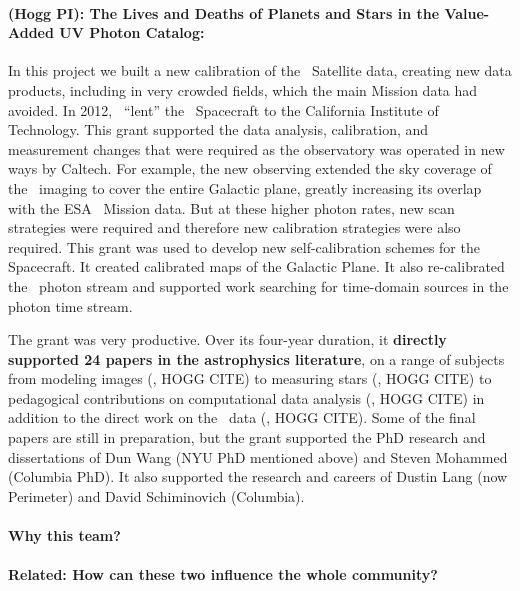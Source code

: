 \documentclass[12pt, letterpaper]{article}
\begin{document}
\paragraph{ (Hogg PI):
The Lives and Deaths of Planets and Stars in the Value-Added UV Photon Catalog:}
In this project we built a new calibration of the \GALEX\ Satellite
data, creating new data products, including in very crowded fields,
which the main Mission data had avoided.
In 2012, \NASA\ ``lent'' the \GALEX\ Spacecraft to the California Institute of Technology.
This grant supported the data analysis, calibration, and measurement
changes that were required as the observatory was operated in new
ways by Caltech.
For example, the new observing extended the sky coverage of the \GALEX\ imaging to
cover the entire Galactic plane, greatly increasing its overlap with
the ESA \Gaia\ Mission data.
But at these higher photon rates, new scan strategies were required and therefore
new calibration strategies were also required.
This grant was used to develop new self-calibration schemes for the Spacecraft.
It created calibrated maps of the Galactic Plane.
It also re-calibrated the \GALEX\ photon stream and supported work
searching for time-domain sources in the photon time stream.

The grant was very productive. Over its four-year duration, it
\textbf{directly supported 24 papers in the astrophysics literature}, on a
range of subjects from modeling images (\eg, HOGG CITE)
to measuring stars (\eg, HOGG CITE)
to pedagogical contributions on computational data analysis (\eg, HOGG CITE)
in addition to the direct work on the \GALEX\ data (\eg, HOGG CITE).
Some of the final papers are still in preparation, but the grant
supported the PhD research and dissertations of Dun Wang (NYU PhD
mentioned above) and Steven Mohammed (Columbia PhD).
It also supported the research and careers of Dustin Lang (now
Perimeter) and David Schiminovich (Columbia).


\paragraph{Why this team?}

\paragraph{Related: How can these two influence the whole community?}
\end{document}
